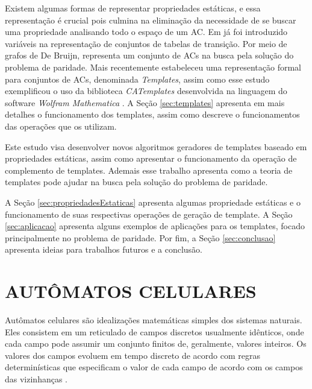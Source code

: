 \documentclass[12pt,a4paper]{article}
\let\stdsection\section
\renewcommand\section{\newpage\stdsection}
\begin{document}
Existem algumas formas de representar propriedades estáticas, e essa representação é crucial pois culmina na eliminação da necessidade de se buscar uma propriedade analisando todo o espaço de um AC. Em  já foi introduzido variáveis na representação de conjuntos de tabelas de transição. Por meio de grafos de De Bruijn,  representa um conjunto de ACs na busca pela solução do problema de paridade. Mais recentemente  estabeleceu uma representação formal para conjuntos de ACs, denominada \textit{Templates}, assim como esse estudo exemplificou o uso da biblioteca \textit{CATemplates} \cite{CATemplates} desenvolvida na linguagem do software \textit{Wolfram Mathematica} \cite{woframMathematica10}. A Seção \ref{sec:templates} apresenta em mais detalhes o funcionamento dos templates, assim como descreve o funcionamentos das operações que os utilizam.

Este estudo visa desenvolver novos algoritmos geradores de templates baseado em propriedades estáticas, assim como apresentar o funcionamento da operação de complemento de templates. Ademais esse trabalho apresenta como a teoria de templates pode ajudar na busca pela solução do problema de paridade.

A Seção \ref{sec:propriedadesEstaticas} apresenta algumas propriedade estáticas e o funcionamento de suas respectivas operações de geração de template. A Seção \ref{sec:aplicacao} apresenta alguns exemplos de aplicações para os templates, focado principalmente no problema de paridade. Por fim, a Seção \ref{sec:conclusao} apresenta ideias para trabalhos futuros e a conclusão.









\section{AUTÔMATOS CELULARES}\label{sec:acs}
Autômatos celulares são idealizações matemáticas simples dos sistemas naturais. Eles consistem em um reticulado de campos discretos usualmente idênticos, onde cada campo pode assumir um conjunto finitos de, geralmente, valores inteiros. Os valores dos campos evoluem em tempo discreto de acordo com regras determinísticas que especificam o valor de cada campo de acordo com os campos das vizinhanças \cite{wolfram1994cellular}.
\end{document}
